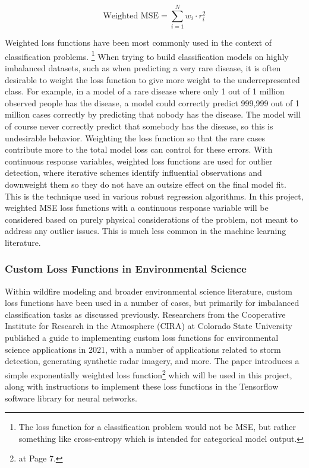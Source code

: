 \documentclass[11pt]{article}%
\begin{document}
\[
\text{Weighted MSE} = \sum_{i=1}^N w_i\cdot r_i^2
\] 

Weighted loss functions have been most commonly used in the context of classification problems. \footnote{The loss function for a classification problem would not be MSE, but rather something like cross-entropy which is intended for categorical model output.} When trying to build classification models on highly imbalanced datasets, such as when predicting a very rare disease, it is often desirable to weight the loss function to give more weight to the underrepresented class. For example, in a model of a rare disease where only 1 out of 1 million observed people has the disease, a model could correctly predict 999,999 out of 1 million cases correctly by predicting that nobody has the disease. The model will of course never correctly predict that somebody has the disease, so this is undesirable behavior. Weighting the loss function so that the rare cases contribute more to the total model loss can control for these errors. With continuous response variables, weighted loss functions are used for outlier detection, where iterative schemes identify influential observations and downweight them so they do not have an outsize effect on the final model fit. This is the technique used in various robust regression algorithms.\cite{OLeary-1990-RRC} In this project, weighted MSE loss functions with a continuous response variable will be considered based on purely physical considerations of the problem, not meant to address any outlier issues. This is much less common in the machine learning literature.

\subsubsection{Custom Loss Functions in Environmental Science}

Within wildfire modeling and broader environmental science literature, custom loss functions have been used in a number of cases, but primarily for imbalanced classification tasks as discussed previously. Researchers from the Cooperative Institute for Research in the Atmosphere (CIRA) at Colorado State University published a guide to implementing custom loss functions for environmental science applications in 2021, with a number of applications related to storm detection, generating synthetic radar imagery, and more. \cite{Ebert-2021-GCL} The paper introduces a simple exponentially weighted loss function\footnote{\cite{Ebert-2021-GCL} at Page 7.} which will be used in this project, along with instructions to implement these loss functions in the Tensorflow software library for neural networks.
\end{document}
